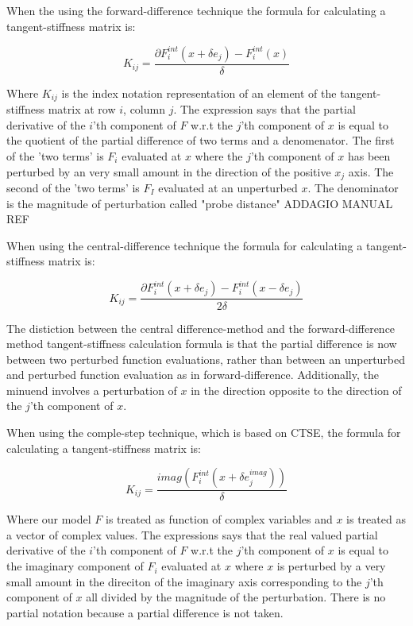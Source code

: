 \documentclass[preprint,12pt]{elsarticle}
\begin{document}
When the using the forward-difference technique the formula for calculating a tangent-stiffness
matrix is:

\begin{equation} K_{ij} = \frac{\partial F_i^{int}(x + \delta e_j) - F_i^{int}(x)}{\delta}
\end{equation}

Where $K_{ij}$ is the index notation representation of an element of the tangent-stiffness matrix at
row $i$, column $j$. The expression says that the partial derivative of the $i$'th component of $F$
w.r.t the $j$'th component of $x$ is equal to the quotient of the partial difference of two terms
and a denomenator. The first of the 'two terms' is $F_i$ evaluated at $x$ where
the $j$'th component of $x$ has been perturbed by an very small amount in the direction of the
positive $x_j$ axis. The second of the 'two terms' is $F_I$ evaluated at an unperturbed $x$. The
denominator is the magnitude of perturbation called "probe distance" {ADDAGIO MANUAL REF}

When using the central-difference technique the formula for calculating a tangent-stiffness matrix
is:

\begin{equation} K_{ij} = \frac{\partial F_i^{int}(x + \delta e_j) - F_i^{int}(x - \delta
e_j)}{2\delta} \end{equation}

The distiction between the central difference-method and the forward-difference method
tangent-stiffness calculation formula is that the partial difference is now between two perturbed
function evaluations, rather than between an unperturbed and perturbed function evaluation as in
forward-difference. Additionally, the minuend involves a perturbation of $x$ in the direction opposite to
the direction of the $j$'th component of $x$. 

When using the comple-step technique, which is based on CTSE, the formula for calculating a
tangent-stiffness matrix is:

\begin{equation} K_{ij} = \frac{imag(F_i^{int}(x + \delta e_j^{imag}))}{\delta} \end{equation}

Where our model $F$ is treated as function of complex variables and $x$ is treated as a vector of
complex values. The expressions says that the real valued partial derivative of the $i$'th component of $F$
w.r.t the $j$'th component of $x$ is equal to the imaginary component of $F_i$ evaluated at $x$
where $x$ is perturbed by a very small amount in the direciton of the imaginary axis corresponding
to the $j$'th component of $x$ all divided by the magnitude of the perturbation. There is no partial
notation because a partial difference is not taken.
\end{document}
